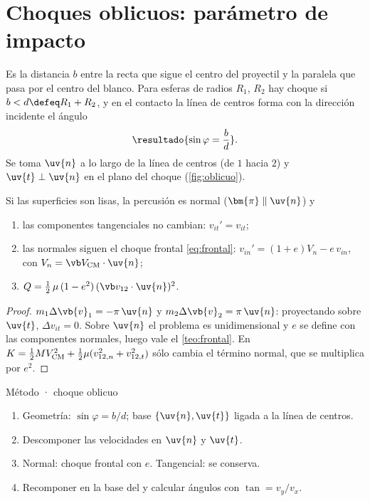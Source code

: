 \section{Choques oblicuos: parámetro de impacto}
\label{sec:oblicuas}

\begin{definicion}
\label{def:b}
Es la distancia $b$ entre la recta que sigue el centro del proyectil y la paralela que
pasa por el centro del blanco. Para esferas de radios $R_{1}$, $R_{2}$ hay choque si
$b<d\defeq R_{1}+R_{2}$, y en el contacto la línea de centros forma con la dirección
incidente el ángulo
\begin{equation}
  \resultado{\sin\varphi=\frac bd} .
\end{equation}
Se toma $\uv{n}$ a lo largo de la línea de centros (de $1$ hacia $2$) y $\uv{t}\perp\uv{n}$ en el
plano del choque (\cref{fig:oblicuo}).
\end{definicion}

\begin{proposicion}
\label{prop:lisas}
Si las superficies son lisas, la percusión es normal ($\bm{\pi}\parallel\uv{n}$) y
\begin{enumerate}[label=\textup{(\alph*)},leftmargin=2em]
  \item las componentes tangenciales no cambian: $v_{it}'=v_{it}$;
  \item las normales siguen el choque frontal \eqref{eq:frontal}: $v_{in}'=(1+e)V_{n}-e\,v_{in}$,
        con $V_{n}=\Vcm\cdot\uv{n}$;
  \item $Q=\tfrac12\,\mu\,(1-e^{2})\,(\vrel\cdot\uv{n})^{2}$.
\end{enumerate}
\end{proposicion}

\begin{proof}
$m_{1}\Delta\vb{v}_{1}=-\pi\,\uv{n}$ y $m_{2}\Delta\vb{v}_{2}=\pi\,\uv{n}$: proyectando sobre $\uv{t}$, $\Delta v_{it}=0$.
Sobre $\uv{n}$ el problema es unidimensional y $e$ se define con las componentes normales,
luego vale el \cref{teo:frontal}. En $K=\tfrac12MV_{\mathrm{CM}}^{2}+\tfrac12\mu(v_{12,n}^{2}+v_{12,t}^{2})$ sólo
cambia el término normal, que se multiplica por $e^{2}$.
\end{proof}

\begin{clave}{Método · choque oblicuo}
\begin{enumerate}[leftmargin=1.4em]
  \item Geometría: $\sin\varphi=b/d$; base $\{\uv{n},\uv{t}\}$ ligada a la línea de centros.
  \item Descomponer las velocidades en $\uv{n}$ y $\uv{t}$.
  \item Normal: choque frontal con $e$. Tangencial: se conserva.
  \item Recomponer en la base del \lab{} y calcular ángulos con $\tan=v_{y}/v_{x}$.
\end{enumerate}
\end{clave}

